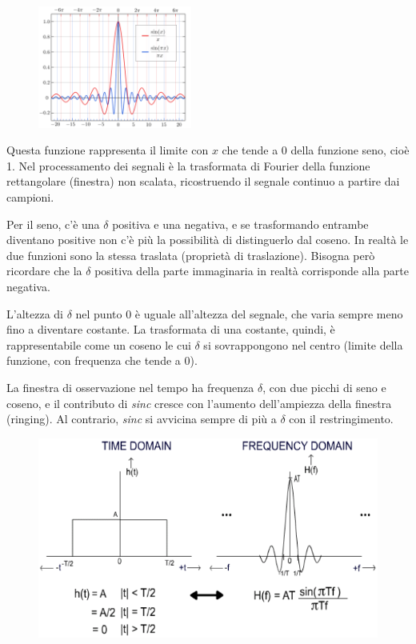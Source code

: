 \begin{figure}
	\vspace{-15pt}
	\includegraphics[width=0.45\textwidth]{Lezioni/Immagini/sinc.png}
	\vspace{-30pt}
\end{figure}

Questa funzione rappresenta il limite con $x$ che tende a 0 della funzione seno, cioè 1. Nel processamento dei segnali è la trasformata di Fourier della funzione rettangolare (finestra) non scalata, ricostruendo il segnale continuo a partire dai campioni.

Per il seno, c'è una $\delta$ positiva e una negativa, e se trasformando entrambe diventano positive non c'è più la possibilità di distinguerlo dal coseno. In realtà le due funzioni sono la stessa traslata (proprietà di traslazione). Bisogna però ricordare che la $\delta$ positiva della parte immaginaria in realtà corrisponde alla parte negativa.

L'altezza di $\delta$ nel punto 0 è uguale all'altezza del segnale, che varia sempre meno fino a diventare costante. La trasformata di una costante, quindi, è rappresentabile come un coseno le cui $\delta$ si sovrappongono nel centro (limite della funzione, con frequenza che tende a 0).

La finestra di osservazione nel tempo ha frequenza $\delta$, con due picchi di seno e coseno, e il contributo di \textit{sinc} cresce con l'aumento dell'ampiezza della finestra (ringing). Al contrario, \textit{sinc} si avvicina sempre di più a $\delta$ con il restringimento.

\begin{figure}[h]
	\centering
	\includegraphics[scale=0.6]{Lezioni/Immagini/finestra_sinc}
\end{figure}
